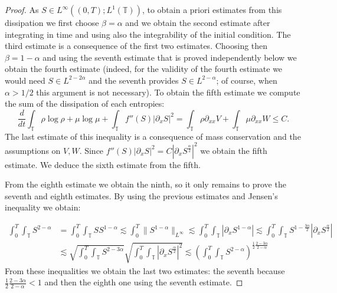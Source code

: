 \documentclass[a4paper,twosided, 11pt]{article}
\newcommand {\T}  { {\mathbb{T}} }
\theoremstyle{plain}
\theoremstyle{remark}
\numberwithin{equation}{section}
\begin{document}
\begin{proof}
As $S\in L^{\infty}((0,T); L^{1}(\T))$, to obtain a priori estimates from this dissipation we first choose $\beta=\alpha$  and we obtain the second estimate after integrating in time and using also the integrability of the initial condition. The third estimate is a consequence of the first two estimates. Choosing then $\beta=1-\alpha$ and using the seventh estimate that is proved independently below we obtain the fourth estimate (indeed, for the validity of the fourth estimate we would need $S\in L^{2-2\alpha}$ and the seventh provides $S\in L^{2-\alpha}$; of course, when $\alpha>1/2$ this argument is not necessary).
To obtain the fifth estimate we compute the sum of the dissipation of each entropies: 
\begin{equation*}
\frac{d}{dt}\int_{\T}\rho\log\rho +\mu\log\mu + \int_{\T}f''(S)|\partial_xS|^2 = \int_{\T} \rho \partial_{xx}V +\int_{\T}\mu\partial_{xx}W\le C.   
\end{equation*}
The last estimate of this inequality is a consequence of mass conservation and the assumptions on $V,W$. Since $f''(S)|\partial_x S|^2 = C|\partial_x S^{\frac{\alpha}{2}}|^2$ we obtain the fifth estimate. We deduce the sixth estimate from the fifth.

From the eighth estimate we obtain the ninth, so it only remains to prove the seventh and eighth estimates. By using the previous estimates and Jensen's inequality we obtain:

\begin{align*}
\int_{0}^{T}\int_{\T}S^{2-\alpha}&= \int_{0}^{T}\int_{\T}SS^{1-\alpha}
\lesssim  \int_{0}^{T}\|S^{1-\alpha}\|_{L^{\infty}} \lesssim \int_{0}^{T}\int_{\T}\left|\partial_x S^{1-\alpha}\right|\lesssim \int_{0}^{T}\int_{\T}S^{1-\frac{3\alpha}{2}}|\partial_x S^{\frac{\alpha}{2}}|\\
&\lesssim \sqrt{\int_{0}^{T}\int_{\T}S^{2-3\alpha}}\sqrt{\int_{0}^{T}\int_{\T}|\partial_x S^{\frac{\alpha}{2}}|^2} \lesssim \left(\int_{0}^{T}\int_{\T}S^{2-\alpha}\right)^{\frac{1}{2}\frac{2-3\alpha}{2-\alpha}}
\end{align*}
From these inequalities we obtain the last two estimates: the seventh because $\frac{1}{2}\frac{2-3\alpha}{2-\alpha}<1$ and then the eighth one using the seventh estimate. 
\end{proof}
\end{document}

